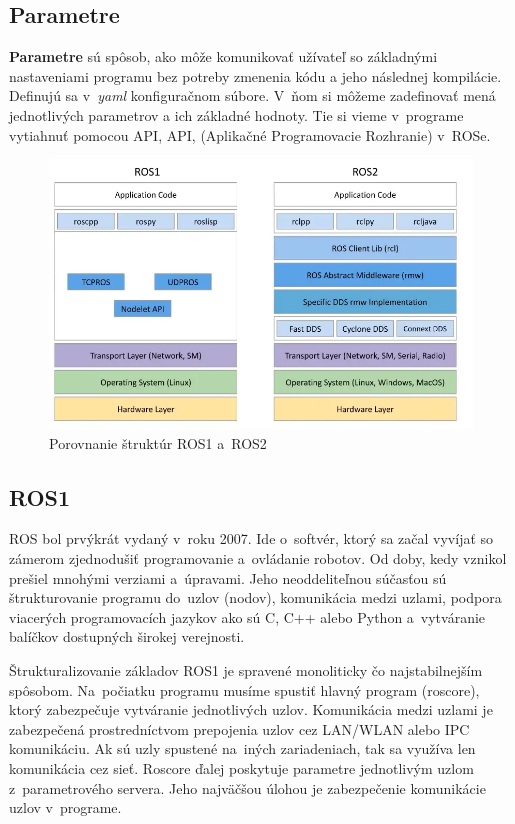 \subsection{Parametre}

\label{s_parametre}
\textbf{Parametre} sú spôsob, ako môže komunikovať užívateľ so základnými nastaveniami programu bez potreby zmenenia kódu a jeho následnej kompilácie.
Definujú sa v~\textit{yaml} konfiguračnom súbore. V~ňom si môžeme zadefinovať mená jednotlivých parametrov a ich základné hodnoty. Tie si vieme v~programe
vytiahnuť pomocou API, \acrlong{API}, (Aplikačné Programovacie Rozhranie) v~ROSe.

\begin{figure}[!htbp]
	\centering
	\includegraphics[width=15cm]{img/strukturaRos1Ros2.png}
	\caption{Porovnanie štruktúr ROS1 a~ROS2~\cite{comparison}}
	\label{fig:struktury}
\end{figure}

\subsection{ROS1}

\noindent ROS bol prvýkrát vydaný v~roku 2007. Ide o~softvér, ktorý sa začal vyvíjať so zámerom zjednodušiť programovanie a~ovládanie robotov. Od doby,
kedy vznikol prešiel mnohými verziami a~úpravami. Jeho neoddeliteľnou súčasťou sú štrukturovanie programu do~uzlov (nodov), komunikácia medzi uzlami,
podpora viacerých programovacích jazykov ako sú C, C++ alebo Python a~vytváranie balíčkov dostupných širokej verejnosti.

Štrukturalizovanie základov ROS1 je spravené monoliticky čo najstabilnejším spôsobom. Na~počiatku programu musíme spustiť hlavný program (roscore),
ktorý zabezpečuje vytváranie jednotlivých uzlov. Komunikácia medzi uzlami je zabezpečená prostredníctvom prepojenia uzlov cez LAN/WLAN alebo IPC komunikáciu.
Ak sú uzly spustené na~iných zariadeniach, tak sa využíva len komunikácia cez sieť. Roscore ďalej poskytuje parametre jednotlivým uzlom z~parametrového
servera. Jeho najväčšou úlohou je zabezpečenie komunikácie uzlov v~programe.

